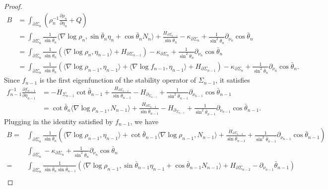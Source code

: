 \documentclass[11pt,letterpaper]{amsart}
\begin{document}
\begin{proof}
\begin{align*}
    B&=\int_{\partial\Sigma_n}\left(\rho_n^{-1}\frac{\partial \rho_n}{\partial \eta_n}+Q\right)\\
    &=\int_{\partial\Sigma_n} \frac{1}{\sin\bar{\theta}_n}\langle \nabla \log \rho_n,\sin\bar{\theta}_n\eta_n+\cos\bar{\theta}_nN_n\rangle+\frac{H_{\partial\Sigma_{n-1}}}{\sin\bar{\theta}_n}-\kappa_{\partial\Sigma_n}+\frac{1}{\sin^2\bar{\theta}_n}\partial_{\nu_n}\cos\bar{\theta}_n\\
    &=\int_{\partial\Sigma_n}\frac{1}{\sin\bar{\theta}_n}\left(\langle \nabla\log \rho_n,\eta_{n-1}\rangle+H_{\partial \Sigma_{n-1}}\right)-\kappa_{\partial\Sigma_n}+\frac{1}{\sin^2\bar{\theta}_n}\partial_{\nu_n}\cos\bar{\theta}_n\\
    &=\int_{\partial\Sigma_n}\frac{1}{\sin\bar{\theta}_n}\left(\langle \nabla \log \rho_{n-1},\eta_{n-1}\rangle +\langle \nabla \log f_{n-1},\eta_{n-1}\rangle +H_{\partial\Sigma_{n-1}}\right)-\kappa_{\partial\Sigma_n}+\frac{1}{\sin^2\bar{\theta}_n}\partial_{\nu_n}\cos\bar{\theta}_n.
\end{align*}
Since $f_{n-1}$ is the first eigenfunction of the stability operator of $\Sigma_{n-1}$, it satisfies
\begin{align*}
f_{n-1}^{-1}\frac{\partial f_{n-1}}{\partial \eta_{n-1}}&=-H_{\Sigma_{n-1}}\cot\bar{\theta}_{n-1}+\frac{H_{\partial\Sigma_{n-2}}}{\sin\bar{\theta}_{n-1}}-H_{\partial_{\Sigma_{n-1}}}+\frac{1}{\sin^2\bar{\theta}_{n-1}}\partial_{\nu_{n-1}}\cos\bar{\theta}_{n-1}\\
&=\cot\bar{\theta}_n\langle \nabla\log \rho_{n-1},N_{n-1}\rangle+\frac{H_{\partial\Sigma_{n-2}}}{\sin\bar{\theta}_{n-1}}-H_{\partial_{\Sigma_{n-1}}}+\frac{1}{\sin^2\bar{\theta}_{n-1}}\partial_{\nu_{n-1}}\cos\bar{\theta}_{n-1}.
\end{align*}
Plugging in the identity satisfied by $f_{n-1}$, we have
\begin{align*}
    B=&\int_{\partial\Sigma_n}\frac{1}{\sin\bar{\theta}_n}\left(\langle \nabla \log \rho_{n-1},\eta_{n-1}\rangle +\cot\bar{\theta}_{n-1}\langle\nabla\log \rho_{n-1},N_{n-1}\rangle +\frac{H_{\partial \Sigma_{n-2}}}{\sin\bar{\theta}_{n-1}}+\frac{1}{\sin^2\bar{\theta}_{n-1}}\partial_{\nu_{n-1}}\cos\bar{\theta}_{n-1}\right)\\
    &\int_{\partial\Sigma_n}-\kappa_{\partial\Sigma_n}+\frac{1}{\sin^2\bar{\theta}_n}\partial_{\nu_n}\cos\bar{\theta}_n\\
    =&\int_{\partial\Sigma_n}\frac{1}{\sin\bar{\theta}_n\sin\bar{\theta}_{n-1}}\left(\langle \nabla \log \rho_{n-1},\sin\bar{\theta}_{n-1}\eta_{n-1}+\cos\bar{\theta}_{n-1}N_{n-1}\rangle +H_{\partial\Sigma_{n-2}}-\partial_{\nu_{n-1}}\bar{\theta}_{n-1}\right)\\

\end{align*}
\end{proof}
\end{document}
